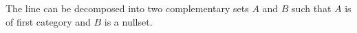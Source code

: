 The line can be decomposed into two complementary sets $A$ and $B$ such that $A$ is of first category and $B$ is a nullset.
